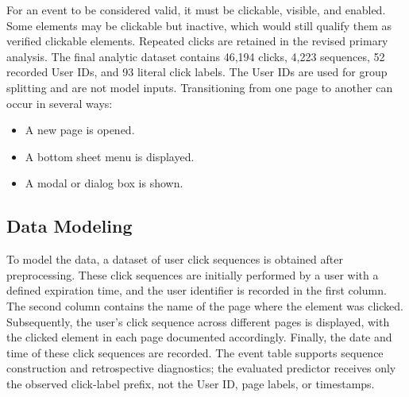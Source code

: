 \documentclass[sn-mathphys-num, Numbered]{sn-jnl}%
\theoremstyle{thmstyleone}%
\theoremstyle{thmstyletwo}%
\theoremstyle{thmstylethree}%
\providecommand{\DIFadd}[1]{{\protect\color{green!40!black}#1}} %
\providecommand{\DIFdel}[1]{}                      %
\providecommand{\DIFaddbegin}{} %
\providecommand{\DIFaddend}{} %
\providecommand{\DIFdelbegin}{} %
\providecommand{\DIFdelend}{} %
\newcommand{\DIFscaledelfig}{0.5}
\newlength{\DIFdelgraphicswidth} %
\newlength{\DIFdelgraphicsheight} %
\newcommand{\DIFaddincludegraphics}[2][]{{\color{blue}\fbox{\DIFOincludegraphics[#1]{#2}}}} %
\newcommand{\DIFdelincludegraphics}[2][]{%
\sbox{\DIFdelgraphicsbox}{\DIFOincludegraphics[#1]{#2}}%
\settoboxwidth{\DIFdelgraphicswidth}{\DIFdelgraphicsbox} %
\settoboxtotalheight{\DIFdelgraphicsheight}{\DIFdelgraphicsbox} %
\scalebox{\DIFscaledelfig}{%
\parbox[b]{\DIFdelgraphicswidth}{\usebox{\DIFdelgraphicsbox}\\[-\baselineskip] \rule{\DIFdelgraphicswidth}{0em}}\llap{\resizebox{\DIFdelgraphicswidth}{\DIFdelgraphicsheight}{%
\setlength{\unitlength}{\DIFdelgraphicswidth}%
\begin{picture}(1,1)%
\thicklines\linethickness{2pt} %
{\color[rgb]{1,0,0}\put(0,0){\framebox(1,1){}}}%
{\color[rgb]{1,0,0}\put(0,0){\line( 1,1){1}}}%
{\color[rgb]{1,0,0}\put(0,1){\line(1,-1){1}}}%
\end{picture}%
}\hspace*{3pt}}} %
} %
\DeclareRobustCommand{\DIFaddbegin}{\DIFOaddbegin \let\includegraphics\DIFaddincludegraphics} %
\DeclareRobustCommand{\DIFaddend}{\DIFOaddend \let\includegraphics\DIFOincludegraphics} %
\DeclareRobustCommand{\DIFdelbegin}{\DIFOdelbegin \let\includegraphics\DIFdelincludegraphics} %
\DeclareRobustCommand{\DIFdelend}{\DIFOaddend \let\includegraphics\DIFOincludegraphics} %
\begin{document}
For an event to be considered valid, it must be clickable, visible, and enabled. Some elements may be clickable but inactive, which would still qualify them as verified clickable elements.
\DIFdelbegin \DIFdel{Subsequently, user sequences exhibiting outlier behaviors, such as repeated clicks on the same element, were filtered out. The resulting dataset included more than 35,000 clicks, forming click sequencesof 50 Android users. }\DIFdelend \DIFaddbegin \DIFadd{Repeated clicks are retained in the revised primary analysis. The final analytic dataset contains 46,194 clicks, 4,223 sequences, 52 recorded User IDs, and 93 literal click labels. The User IDs are used for group splitting and are not model inputs.
}\DIFaddend Transitioning from one page to another can occur in several ways:
\begin{itemize}
	\item 
	A new page is opened.
	\item 
	A bottom sheet menu is displayed.
	\item 
	A modal or dialog box is shown.
\end{itemize}




\subsection{Data Modeling}
To model the data, a dataset of user click sequences is obtained after preprocessing. These click sequences are initially performed by a user with a defined expiration time, and the user identifier is recorded in the first column. The second column contains the name of the page where the element was clicked. Subsequently, the user's click sequence across different pages is displayed, with the clicked element in each page documented accordingly. Finally, the date and time of these click sequences are recorded. \DIFdelbegin \DIFdel{This dataset is then used as input to the model}\DIFdelend \DIFaddbegin \DIFadd{The event table supports sequence construction and retrospective diagnostics; the evaluated predictor receives only the observed click-label prefix, not the User ID, page labels, or timestamps}\DIFaddend .
\end{document}
